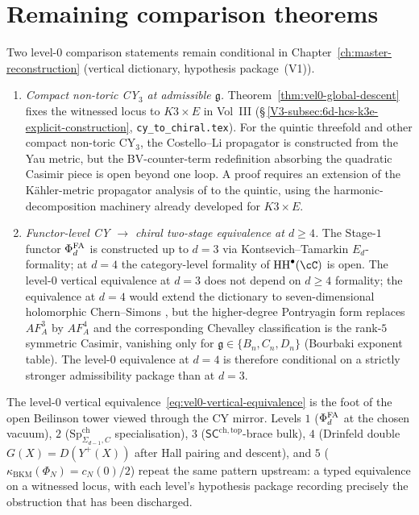 \section{Remaining comparison theorems}
\label{sec:vel0-frontier}

Two level-$0$ comparison statements remain conditional in
Chapter~\ref{ch:master-reconstruction} \textup{(}vertical dictionary,
hypothesis package~\textup{(V1)}\textup{)}.

\begin{enumerate}[label=\textup{(O\arabic*)}]
\item \emph{Compact non-toric CY$_3$ at admissible
$\mathfrak g$.}
Theorem~\ref{thm:vel0-global-descent} fixes the witnessed locus to
$K3 \times E$ in Vol~III \textup{(}\S$\,$\ref{V3-subsec:6d-hcs-k3e-explicit-construction},
\texttt{cy\_to\_chiral.tex}\textup{).} For the quintic threefold and
other compact non-toric CY$_3$, the Costello--Li propagator is
constructed from the Yau metric, but the BV-counter-term redefinition
absorbing the quadratic Casimir piece is open beyond one loop. A proof
requires an extension of the K\"ahler-metric propagator analysis of
\cite{CostelloLi2020} to the quintic, using the harmonic-decomposition
machinery already developed for $K3 \times E$.
\item \emph{Functor-level CY $\to$ chiral two-stage equivalence at
$d \geq 4$.}
The Stage-$1$ functor $\Phi^{\mathrm{FA}}_d$ is constructed up to $d = 3$ via
Kontsevich--Tamarkin $E_d$-formality; at $d = 4$ the category-level
formality of $\mathrm{HH}^\bullet(\cC)$ is open. The level-$0$
vertical equivalence at $d = 3$ does not depend on $d \geq 4$
formality; the equivalence at $d = 4$ would extend the dictionary to
seven-dimensional holomorphic Chern--Simons \cite{CostelloGaiotto2020},
but the higher-degree Pontryagin form replaces $A F_A^3$ by $A F_A^4$
and the corresponding Chevalley classification is the rank-$5$
symmetric Casimir, vanishing only for $\mathfrak g \in \{B_n, C_n, D_n\}$
(Bourbaki exponent table). The level-$0$ equivalence at $d = 4$ is
therefore conditional on a strictly stronger admissibility
package than at $d = 3$.
\end{enumerate}

The level-$0$ vertical equivalence~\eqref{eq:vel0-vertical-equivalence}
is the foot of the open Beilinson tower viewed through the CY mirror.
Levels $1$ ($\Phi^{\mathrm{FA}}_d$ at the chosen vacuum), $2$
($\mathrm{Sp}^{\mathrm{ch}}_{\Sigma_{d-1}, C}$ specialisation), $3$
($\mathsf{SC}^{\mathrm{ch,top}}$-brace bulk), $4$ (Drinfeld double
$G(X) = D(Y^+(X))$ after Hall pairing and descent), and $5$
($\kappa_{\mathrm{BKM}}(\Phi_N) = c_N(0)/2$) repeat the same pattern
upstream: a typed equivalence on a witnessed locus, with each level's
hypothesis package recording precisely the obstruction that has been
discharged.
